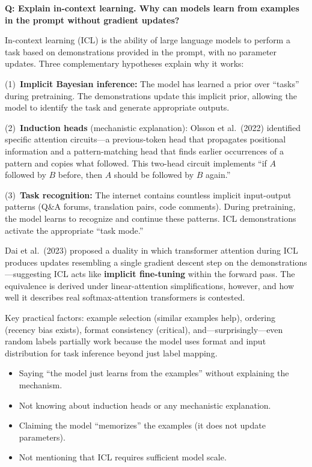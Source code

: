 \begin{interviewq}
\textbf{Q: Explain in-context learning. Why can models learn from examples
in the prompt without gradient updates?}

 \quad {} \quad
\badgefreq{\freqhigh}

\stronganswer
In-context learning (ICL) is the ability of large language models to perform
a task based on demonstrations provided in the prompt, with no parameter
updates.  Three complementary hypotheses explain why it works:

(1)~\textbf{Implicit Bayesian inference:} The model has learned a prior over
``tasks'' during pretraining.  The demonstrations update this implicit prior,
allowing the model to identify the task and generate appropriate outputs.

(2)~\textbf{Induction heads} (mechanistic explanation): Olsson et al.\ (2022)
identified specific attention circuits---a previous-token head that propagates
positional information and a pattern-matching head that finds earlier
occurrences of a pattern and copies what followed.  This two-head circuit
implements ``if $A$ followed by $B$ before, then $A$ should be followed by $B$
again.''

(3)~\textbf{Task recognition:} The internet contains countless implicit
input-output patterns (Q\&A forums, translation pairs, code comments).
During pretraining, the model learns to recognize and continue these
patterns.  ICL demonstrations activate the appropriate ``task mode.''

Dai et al.\ (2023) proposed a duality in which transformer attention during
ICL produces updates resembling a single gradient descent step on the
demonstrations---suggesting ICL acts like \textbf{implicit fine-tuning}
within the forward pass.  The equivalence is derived under linear-attention
simplifications, however, and how well it describes real softmax-attention
transformers is contested.

Key practical factors: example selection (similar examples help), ordering
(recency bias exists), format consistency (critical), and---surprisingly---even
random labels partially work because the model uses format and input
distribution for task inference beyond just label mapping.

\redflags
\begin{itemize}
\item Saying ``the model just learns from the examples'' without explaining
  the mechanism.
\item Not knowing about induction heads or any mechanistic explanation.
\item Claiming the model ``memorizes'' the examples (it does not update
  parameters).
\item Not mentioning that ICL requires sufficient model scale.
\end{itemize}


\end{interviewq}
